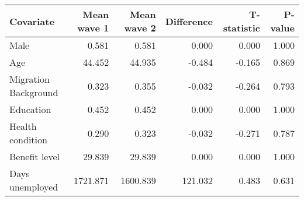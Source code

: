 
\begin{tabular}{lrrrrr}
\toprule
Covariate & Mean wave 1 & Mean wave 2 & Difference & T-statistic & P-value\\
\midrule
Male & 0.581 & 0.581 & 0.000 & 0.000 & 1.000\\
Age & 44.452 & 44.935 & -0.484 & -0.165 & 0.869\\
Migration Background & 0.323 & 0.355 & -0.032 & -0.264 & 0.793\\
Education & 0.452 & 0.452 & 0.000 & 0.000 & 1.000\\
Health condition & 0.290 & 0.323 & -0.032 & -0.271 & 0.787\\
Benefit level & 29.839 & 29.839 & 0.000 & 0.000 & 1.000\\
Days unemployed & 1721.871 & 1600.839 & 121.032 & 0.483 & 0.631\\
\bottomrule
\end{tabular}
